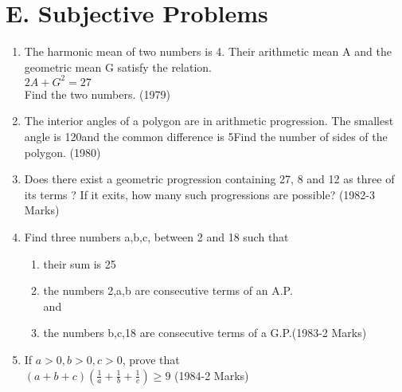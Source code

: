 \documentclass[journal,12pt,twocolumn]{IEEEtran}
\theoremstyle{remark}
\begin{document}
\section*{E. Subjective Problems}
\begin{enumerate}
    \item The harmonic mean of two numbers is 4. Their arithmetic mean A and the geometric mean G satisfy the relation.
    \\
    $2A + G^2 = 27$
    \\
    Find the two numbers.  \hfill{(1979)}

\item The interior angles of a polygon are in arithmetic progression. The smallest angle is 120\degree and the common difference is 5\degree Find the number of sides of the polygon. \hfill{(1980)}

    \item Does there exist a geometric progression containing 27, 8 and 12 as three of its terms ? If it exits, how many such progressions are possible?  \hfill{(1982-3 Marks)}

    \item Find three numbers a,b,c, between 2 and 18 such that
    \begin{enumerate}
    \item their sum is 25
    \item the numbers 2,a,b are consecutive terms of an A.P.
    \\
    and
    \item the numbers b,c,18 are consecutive terms of a G.P.\hfill{(1983-2 Marks)}
    \end{enumerate}
  

    \item If $a>0,b>0,c>0$, prove that
    \\
    $(a+b+c)(\frac{1}{a}+\frac{1}{b}+\frac{1}{c})\geq9$
    \hfill{(1984-2 Marks)}

\end{enumerate}
\end{document}
